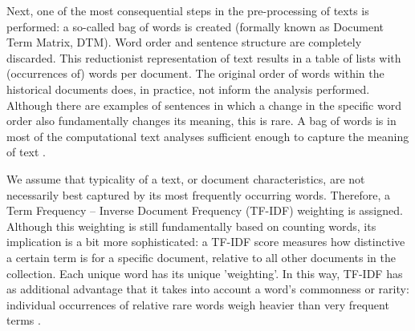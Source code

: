 \documentclass{dhbenelux}
\begin{document}
Next, one of the most consequential steps in the pre-processing of texts is performed: a so-called bag of words is created (formally known as Document Term Matrix, DTM). Word order and sentence structure are completely discarded. This reductionist representation of text results in a table of lists with (occurrences of) words per document. The original order of words within the historical documents does, in practice, not inform the analysis performed. Although there are examples of sentences in which a change in the specific word order also fundamentally changes its meaning, this is rare. A bag of words is in most of the computational text analyses sufficient enough to capture the meaning of text \citep{grimmer_text_2013}. 


\begin{table}[ht]
\caption{Thematically categorised clusters of parliamentary debates on war victims in Dutch parliament}
\label{tab:counts}
\end{table}

We assume that typicality of a text, or document characteristics, are not necessarily best captured by its most frequently occurring words. Therefore, a Term Frequency – Inverse Document Frequency (TF-IDF) weighting is assigned. Although this weighting is still fundamentally based on counting words, its implication is a bit more sophisticated: a TF-IDF score measures how distinctive a certain term is for a specific document, relative to all other documents in the collection. Each unique word has its unique 'weighting'. In this way, TF-IDF has as additional advantage that it takes into account a word's commonness or rarity: individual occurrences of relative rare words weigh heavier than very frequent terms \citep{robertson_understanding_2004, kwartler_text_2017}.
\end{document}
